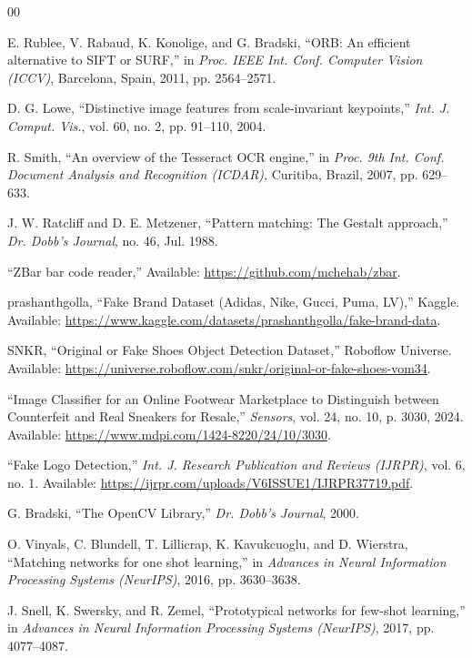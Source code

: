 \documentclass[conference]{IEEEtran}
\begin{document}
\begin{thebibliography}{00}
\setlength{\itemsep}{0pt}
\setlength{\parsep}{0pt}

E. Rublee, V. Rabaud, K. Konolige, and G. Bradski, ``ORB: An efficient alternative to SIFT or SURF,'' in \textit{Proc. IEEE Int. Conf. Computer Vision (ICCV)}, Barcelona, Spain, 2011, pp. 2564--2571.

D. G. Lowe, ``Distinctive image features from scale-invariant keypoints,'' \textit{Int. J. Comput. Vis.}, vol. 60, no. 2, pp. 91--110, 2004.

R. Smith, ``An overview of the Tesseract OCR engine,'' in \textit{Proc. 9th Int. Conf. Document Analysis and Recognition (ICDAR)}, Curitiba, Brazil, 2007, pp. 629--633.

J. W. Ratcliff and D. E. Metzener, ``Pattern matching: The Gestalt approach,'' \textit{Dr. Dobb's Journal}, no. 46, Jul. 1988.

``ZBar bar code reader,'' Available: \url{https://github.com/mchehab/zbar}.

prashanthgolla, ``Fake Brand Dataset (Adidas, Nike, Gucci, Puma, LV),'' Kaggle. Available: \url{https://www.kaggle.com/datasets/prashanthgolla/fake-brand-data}.

SNKR, ``Original or Fake Shoes Object Detection Dataset,'' Roboflow Universe. Available: \url{https://universe.roboflow.com/snkr/original-or-fake-shoes-vom34}.

``Image Classifier for an Online Footwear Marketplace to Distinguish between Counterfeit and Real Sneakers for Resale,'' \textit{Sensors}, vol. 24, no. 10, p. 3030, 2024. Available: \url{https://www.mdpi.com/1424-8220/24/10/3030}.

``Fake Logo Detection,'' \textit{Int. J. Research Publication and Reviews (IJRPR)}, vol. 6, no. 1. Available: \url{https://ijrpr.com/uploads/V6ISSUE1/IJRPR37719.pdf}.

G. Bradski, ``The OpenCV Library,'' \textit{Dr. Dobb's Journal}, 2000.

O. Vinyals, C. Blundell, T. Lillicrap, K. Kavukcuoglu, and D. Wierstra, ``Matching networks for one shot learning,'' in \textit{Advances in Neural Information Processing Systems (NeurIPS)}, 2016, pp. 3630--3638.

J. Snell, K. Swersky, and R. Zemel, ``Prototypical networks for few-shot learning,'' in \textit{Advances in Neural Information Processing Systems (NeurIPS)}, 2017, pp. 4077--4087.


\end{thebibliography}
\end{document}
